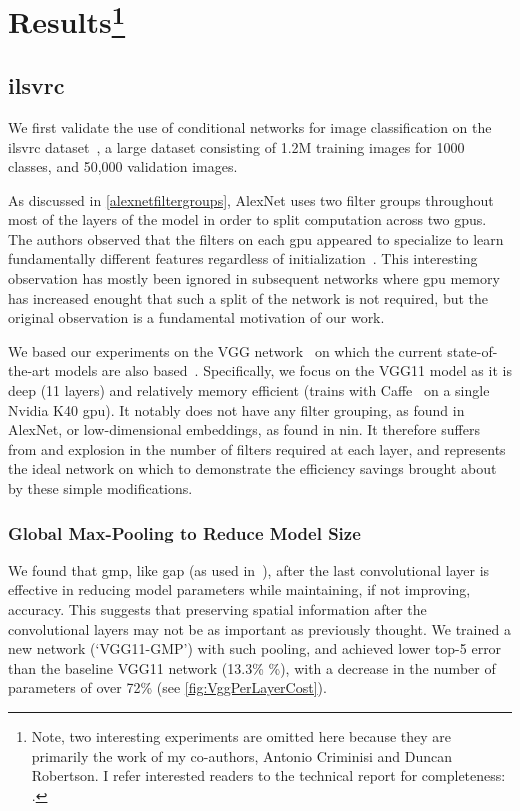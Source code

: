 \documentclass[thesis]{subfiles}
\begin{document}
	\section[Results]{Results\protect\footnote{Note, two interesting experiments are omitted here because they are primarily the work of my co-authors, Antonio Criminisi and Duncan Robertson. I refer interested readers to the technical report for completeness: \citet{Ioannou2015}.}}
	\subsection{\acrshort{ilsvrc}}
	We first validate the use of conditional networks for image classification on the \gls{ilsvrc} dataset~\citep{ILSVRC2015}, a large dataset consisting of 1.2M training images for 1000 classes, and 50,000 validation images.
	
	As discussed in \cref{alexnetfiltergroups}, AlexNet uses two filter groups throughout most of the layers of the model in order to split computation across two \gls{gpu}s. The authors observed that the filters on each \gls{gpu} appeared to specialize to learn fundamentally different features regardless of initialization~\citep{Krizhevsky2012}. This interesting observation has mostly been ignored in subsequent networks where \gls{gpu} memory has increased enought that such a split of the network is not required, but the original observation is a fundamental motivation of our work.
	
	We based our experiments on the VGG network~\citep{Simonyan2014verydeep} on which the current state-of-the-art models are also based~\citep{He2015b}. Specifically, we focus on the VGG11 model as it is deep (11 layers) and relatively memory efficient (trains with Caffe~\citep{Jia2014} on a single Nvidia K40 \gls{gpu}). It notably does not have any filter grouping, as found in AlexNet, or low-dimensional embeddings, as found in \gls{nin}. It therefore suffers from and explosion in the number of filters required at each layer, and represents the ideal network on which to demonstrate the efficiency savings brought about by these simple modifications.
	
	\subsubsection{Global Max-Pooling to Reduce Model Size}
	We found that \gls{gmp}, like \gls{gap} (as used in~\citep{Lin2013NiN,Szegedy2014going}), after the last convolutional layer is effective in reducing model parameters while maintaining, if not improving, accuracy. This suggests that preserving spatial information after the convolutional layers may not be as important as previously thought. 
	We trained a new network (`VGG11-GMP') with such pooling, and achieved lower top-5 error than the baseline VGG11 
	network (13.3\% \%), with a decrease in the number of parameters of over 72\% (see \cref{fig:VggPerLayerCost}).
	
\end{document}
